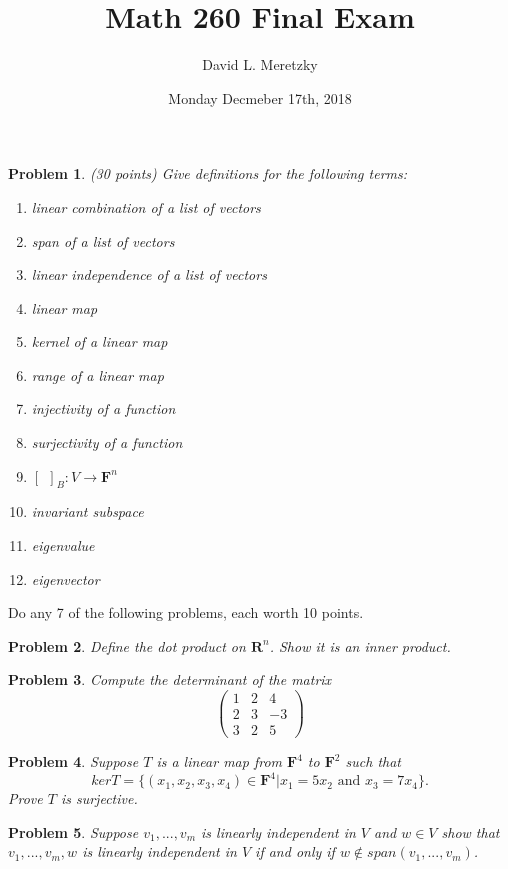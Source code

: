 \documentclass{article}
\title{ \vspace{-10ex} %
Math 260 Final Exam
}
\author{David L. Meretzky
}
\date{%
Monday Decmeber 17th, 2018
}
\theoremstyle{problemstyle}
\newtheorem{problem}{Problem}
\theoremstyle{problemstyle}
\theoremstyle{problemstyle}
\theoremstyle{problemstyle}
\begin{document}
\maketitle

\noindent

\begin{problem}
(30 points) Give definitions for the following terms:
\begin{enumerate}
\item linear combination of a list of vectors
\item span of a list of vectors
\item linear independence of a list of vectors
\item linear map
\item kernel of a linear map
\item range of a linear map
\item injectivity of a function
\item surjectivity of a function
\item $[ \ \ ]_B:V \rightarrow \textbf{F}^n$
\item invariant subspace
\item eigenvalue
\item eigenvector
\end{enumerate}
\end{problem}


Do any 7 of the following problems, each worth 10 points. 
\begin{problem}
Define the dot product on $\textbf{R}^n$. Show it is an inner product. 
\end{problem}

\begin{problem}
Compute the determinant of the matrix
$$\begin{pmatrix}
1 & 2 & 4\\
2 & 3 &-3 \\
3 & 2 & 5 
\end{pmatrix}$$
\end{problem}

\begin{problem}
Suppose $T$ is a linear map from $\textbf{F}^4$ to $\textbf{F}^2$ such that $$ker T = \{(x_1,x_2,x_3,x_4) \in \textbf{F}^4|x_1 = 5x_2 \text{ and } x_3 = 7x_4\}.$$ Prove $T$ is surjective.  
\end{problem}

\begin{problem}
Suppose $v_1,...,v_m$ is linearly independent in $V$ and $w \in V$ show that $v_1,...,v_m,w$ is linearly independent in $V$ if and only if $w \notin span(v_1,...,v_m)$. 
\end{problem}
\end{document}
